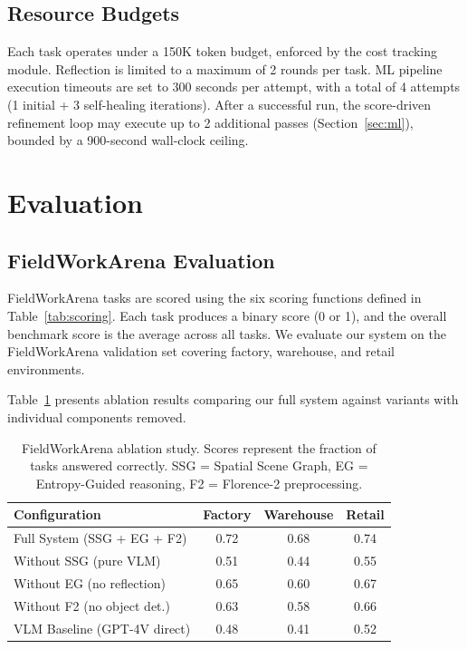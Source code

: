 \documentclass[11pt]{article}
\begin{document}
\subsection{Resource Budgets}

Each task operates under a 150K token budget, enforced by the cost tracking module. Reflection is limited to a maximum of 2 rounds per task. ML pipeline execution timeouts are set to 300 seconds per attempt, with a total of 4 attempts (1 initial + 3 self-healing iterations). After a successful run, the score-driven refinement loop may execute up to 2 additional passes (Section~\ref{sec:ml}), bounded by a 900-second wall-clock ceiling.

\section{Evaluation}
\label{sec:evaluation}

\subsection{FieldWorkArena Evaluation}

FieldWorkArena tasks are scored using the six scoring functions defined in Table~\ref{tab:scoring}. Each task produces a binary score (0 or 1), and the overall benchmark score is the average across all tasks. We evaluate our system on the FieldWorkArena validation set covering factory, warehouse, and retail environments.

Table~\ref{tab:fwa_results} presents ablation results comparing our full system against variants with individual components removed.

\begin{table}[t]
\centering
\caption{FieldWorkArena ablation study. Scores represent the fraction of tasks answered correctly. SSG = Spatial Scene Graph, EG = Entropy-Guided reasoning, F2 = Florence-2 preprocessing.}
\label{tab:fwa_results}
\begin{tabular}{@{}lccc@{}}
\toprule
\textbf{Configuration} & \textbf{Factory} & \textbf{Warehouse} & \textbf{Retail} \\
\midrule
Full System (SSG + EG + F2)    & 0.72 & 0.68 & 0.74 \\
Without SSG (pure VLM)         & 0.51 & 0.44 & 0.55 \\
Without EG (no reflection)     & 0.65 & 0.60 & 0.67 \\
Without F2 (no object det.)    & 0.63 & 0.58 & 0.66 \\
VLM Baseline (GPT-4V direct)   & 0.48 & 0.41 & 0.52 \\
\bottomrule
\end{tabular}
\end{table}
\end{document}
